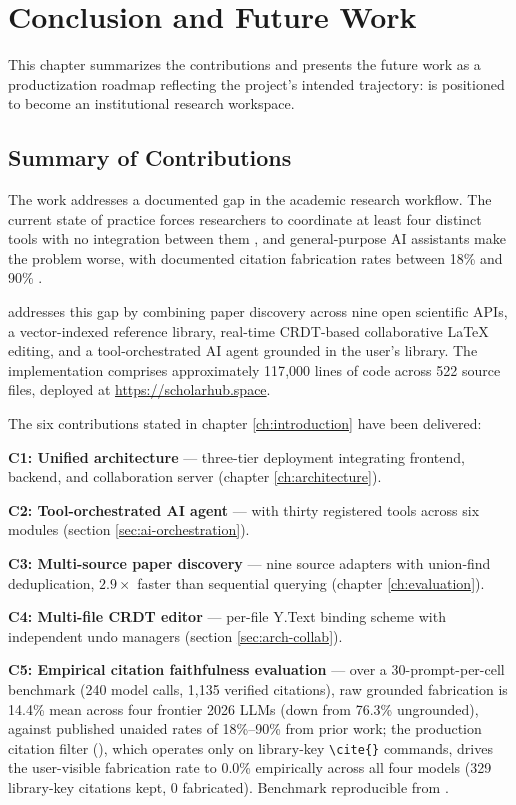 \chapter{Conclusion and Future Work}
\label{ch:conclusion}

This chapter summarizes the contributions and presents the future work as a productization roadmap reflecting the project's intended trajectory: \sh{} is positioned to become an institutional research workspace.

\section{Summary of Contributions}
\label{sec:conc-summary}

The work addresses a documented gap in the academic research workflow. The current state of practice forces researchers to coordinate at least four distinct tools with no integration between them \cite{springer2024fragmentation, khalifa2024aiwriting}, and general-purpose AI assistants make the problem worse, with documented citation fabrication rates between 18\% and 90\% \cite{walters2023fabrication, asai2025openscholar}.

\sh{} addresses this gap by combining paper discovery across nine open scientific APIs, a vector-indexed reference library, real-time CRDT-based collaborative LaTeX editing, and a tool-orchestrated AI agent grounded in the user's library. The implementation comprises approximately 117{,}000 lines of code across 522 source files, deployed at \url{https://scholarhub.space}.

The six contributions stated in chapter \ref{ch:introduction} have been delivered:

\textbf{C1: Unified architecture} — three-tier deployment integrating frontend, backend, and collaboration server (chapter \ref{ch:architecture}).

\textbf{C2: Tool-orchestrated AI agent} —  with thirty registered tools across six modules (section \ref{sec:ai-orchestration}).

\textbf{C3: Multi-source paper discovery} — nine source adapters with union-find deduplication, $2.9\times$ faster than sequential querying (chapter \ref{ch:evaluation}).

\textbf{C4: Multi-file CRDT editor} — per-file Y.Text binding scheme with independent undo managers (section \ref{sec:arch-collab}).

\textbf{C5: Empirical citation faithfulness evaluation} — over a 30-prompt-per-cell benchmark (240 model calls, 1{,}135 verified citations), raw grounded fabrication is 14.4\% mean across four frontier 2026 LLMs (down from 76.3\% ungrounded), against published unaided rates of 18\%--90\% from prior work; the production citation filter (), which operates only on library-key \texttt{\textbackslash cite\{\}} commands, drives the user-visible fabrication rate to 0.0\% empirically across all four models (329 library-key citations kept, 0 fabricated). Benchmark reproducible from .

